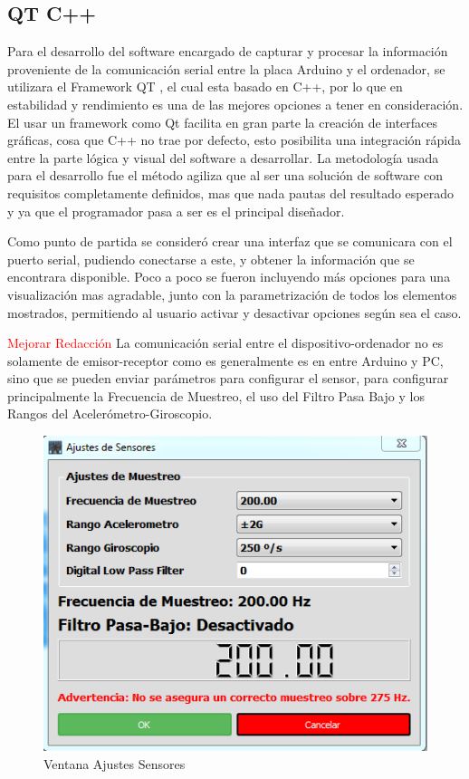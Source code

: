 \documentclass[12pt,a4paper]{article}
\begin{document}
\subsection{QT C++}
Para el desarrollo del software encargado de capturar y procesar la información proveniente de la comunicación serial entre la placa Arduino y el ordenador, se utilizara el Framework QT \cite{QT}, el cual esta basado en C++, por lo que en estabilidad y rendimiento es una de las mejores opciones a tener en consideración.
El usar un framework como Qt facilita en gran parte la creación de interfaces gráficas, cosa que C++ no trae por defecto, esto posibilita una integración rápida entre la parte lógica y visual del software a desarrollar.
La metodología usada para el desarrollo fue el método agiliza que al ser una solución de software con requisitos completamente definidos, mas que nada pautas del resultado esperado y ya que el programador pasa a ser es el principal diseñador.

Como punto de partida se consideró crear una interfaz que se comunicara con el puerto serial, pudiendo conectarse a este, y obtener la información que se encontrara disponible.
Poco a poco se fueron incluyendo más opciones para una visualización mas agradable, junto con la parametrización de todos los elementos mostrados, permitiendo al usuario activar y desactivar opciones según sea el caso.

\textcolor{red}{Mejorar Redacción}
La comunicación serial entre el dispositivo-ordenador no es solamente de emisor-receptor como es generalmente es en entre Arduino y PC, sino que se pueden enviar parámetros para configurar el sensor, para configurar principalmente la Frecuencia de Muestreo, el uso del Filtro Pasa Bajo y los Rangos del Acelerómetro-Giroscopio.

\begin{figure}[H]
\centering
  \includegraphics[scale=0.6]{images/AjustesSensores}
  \caption{Ventana Ajustes Sensores}
  \label{fig:ajustessensores}
\end{figure}
\end{document}
